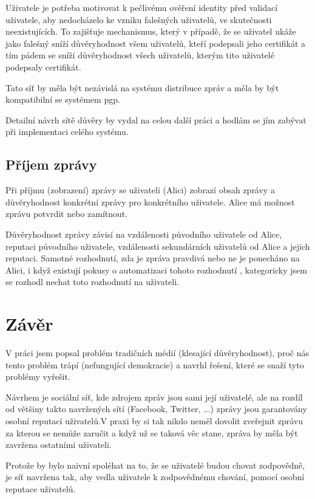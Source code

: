 \documentclass{report}
\begin{document}
Uživatele je potřeba motivovat k pečlivému ověření identity před validací uživatele, aby nedocházelo ke vzniku falešných uživatelů, ve skutečnosti neexistujících. To zajišťuje mechanismus, který v případě, že se uživatel ukáže jako falešný sníží důvěryhodnost všem uživatelů, kteří podepsali jeho certifikát a tím pádem se sníží důvěryhodnost všech uživatelů, kterým tito uživatelé podepsaly certifikát.

Tato síť by měla být nezávislá na systému distribuce zpráv a měla by být kompatibilní se systémem \gls{pgp}.

Detailní návrh sítě důvěry by vydal na celou další práci a hodlám se jím zabývat při implementaci celého systému.

\section{Příjem zprávy}
\label{sec:prijem_zpravy}

Při příjmu (zobrazení) zprávy se uživateli (Alici) zobrazí obsah zprávy a důvěryhodnost konkrétní zprávy pro konkrétního uživatele. Alice má možnost zprávu potvrdit nebo zamítnout.

Důvěryhodnost zprávy závisí na vzdálenosti původního uživatele od Alice, reputaci původního uživatele, vzdálenosti sekundárních uživatelů od Alice a jejich reputaci. Samotné rozhodnutí, zda je zpráva pravdivá nebo ne je ponecháno na Alici, i když existují pokusy o automatizaci tohoto rozhodnutí \citep{giasemidis16}, kategoricky jsem se rozhodl nechat toto rozhodnutí na uživateli.

\chapter{Závěr}
\label{ch:zaver}

V práci jsem popsal problém tradičních médií (klesající důvěryhodnost), proč nás tento problém trápí (nefungující demokracie) a navrhl řešení, které se snaží tyto problémy vyřešit.

Návrhem je sociální síť, kde zdrojem zpráv jsou sami její uživatelé, ale na rozdíl od většiny takto navržených sítí (Facebook, Twitter, ...) zprávy jsou garantovány osobní reputací uživatelů.V praxi by si tak nikdo neměl dovolit zveřejnit zprávu za kterou se nemůže zaručit a když už se taková věc stane, zpráva by měla být zavržena ostatními uživateli.

Protože by bylo naivní spoléhat na to, že se uživatelé budou chovat zodpovědně, je síť navržena tak, aby vedla uživatele k zodpovědnému chování, pomocí osobní reputace uživatelů.
\end{document}
